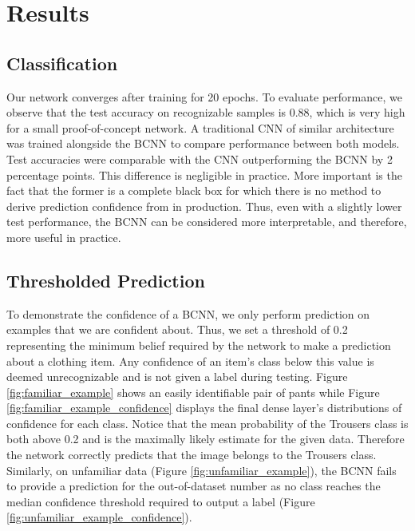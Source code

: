 \newpage 

\section{Results}

\subsection{Classification}

Our network converges after training for 20 epochs. To evaluate performance, we observe that the test accuracy on recognizable samples is 0.88, which is very high for a small proof-of-concept network. A traditional CNN of similar architecture was trained alongside the BCNN to compare performance between both models. Test accuracies were comparable with the CNN outperforming the BCNN by 2 percentage points. This difference is negligible in practice. More important is the fact that the former is a complete black box for which there is no method to derive prediction confidence from in production. Thus, even with a slightly lower test performance, the BCNN can be considered more interpretable, and therefore, more useful in practice.


\subsection{Thresholded Prediction}

To demonstrate the confidence of a BCNN, we only perform prediction on examples that we are confident about. Thus, we set a threshold of 0.2 representing the minimum belief required by the network to make a prediction about a clothing item. Any confidence of an item's class below this value is deemed unrecognizable and is not given a label during testing. Figure \ref{fig:familiar_example} shows an easily identifiable pair of pants while Figure \ref{fig:familiar_example_confidence} displays the final dense layer's distributions of confidence for each class. Notice that the mean probability of the Trousers class is both above 0.2 and is the maximally likely estimate for the given data. Therefore the network correctly predicts that the image belongs to the Trousers class. Similarly, on unfamiliar data (Figure \ref{fig:unfamiliar_example}), the BCNN fails to provide a prediction for the out-of-dataset number as no class reaches the median confidence threshold required to output a label (Figure \ref{fig:unfamiliar_example_confidence}).


